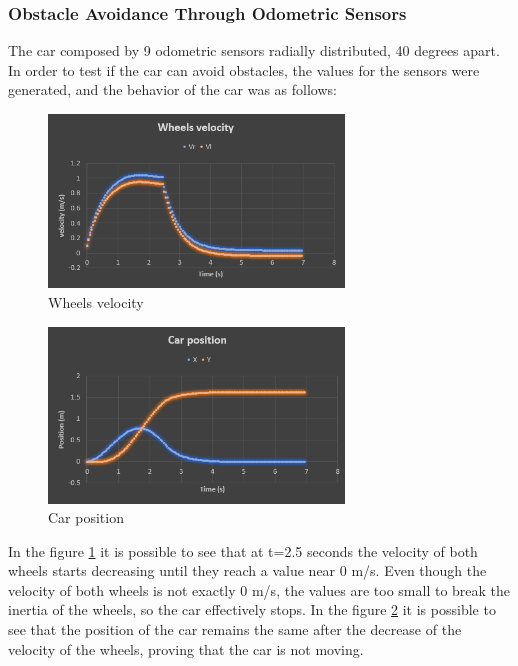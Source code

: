\subsubsection{Obstacle Avoidance Through Odometric Sensors}
The car composed by 9 odometric sensors radially distributed, 40 degrees apart.\\
In order to test if the car can avoid obstacles, the values for the sensors were generated, and the behavior of the car was as follows:\\
\begin{figure}[!h]
\centering
\includegraphics[width=0.7\textwidth]{./img/testodovel.PNG}
\caption {\label{fig:test - odovel}Wheels velocity}
\end{figure}

\begin{figure}[!h]
\centering
\includegraphics[width=0.7\textwidth]{./img/testodoxy.PNG}
\caption {\label{fig:test - odoxy}Car position}
\end{figure}

In the figure \ref{fig:test - odovel} it is possible to see that at t=2.5 seconds the velocity of both wheels starts decreasing until they reach a value near 0 m/s. Even though the velocity of both wheels is not exactly 0 m/s, the values are too small to break the inertia of the wheels, so the car effectively stops.
In the figure \ref{fig:test - odoxy} it is possible to see that the position of the car remains the same after the decrease of the velocity of the wheels, proving that the car is not moving.